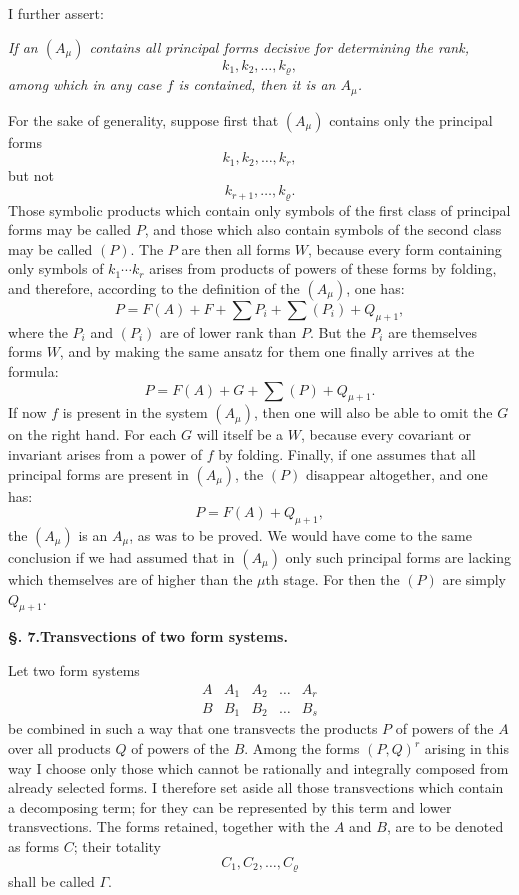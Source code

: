 \documentclass[10pt]{article}
\begin{document}
I further assert:

\emph{If an $(A_\mu)$ contains all principal forms decisive for determining the rank,}
\[
k_1,k_2,\ldots,k_\varrho,
\]
\emph{among which in any case $f$ is contained, then it is an $A_\mu$.}

For the sake of generality, suppose first that $(A_\mu)$ contains only the principal forms
\[
k_1,k_2,\ldots,k_r,
\]
but not
\[
k_{r+1},\ldots,k_\varrho.
\]
Those symbolic products which contain only symbols of the first class of principal forms may be called $P$, and those which also contain symbols of the second class may be called $(P)$. The $P$ are then all forms $W$, because every form containing only symbols of $k_1\cdots k_r$ arises from products of powers of these forms by folding, and therefore, according to the definition of the $(A_\mu)$, one has:
\[
P=F(A)+F+\sum P_i+\sum(P_i)+Q_{\mu+1},
\]
where the $P_i$ and $(P_i)$ are of lower rank than $P$. But the $P_i$ are themselves forms $W$, and by making the same ansatz for them one finally arrives at the formula:
\[
P=F(A)+G+\sum(P)+Q_{\mu+1}.
\]
If now $f$ is present in the system $(A_\mu)$, then one will also be able to omit the $G$ on the right hand. For each $G$ will itself be a $W$, because every covariant or invariant arises from a power of $f$ by folding. Finally, if one assumes that all principal forms are present in $(A_\mu)$, the $(P)$ disappear altogether, and one has:
\[
P=F(A)+Q_{\mu+1},
\]
the $(A_\mu)$ is an $A_\mu$, as was to be proved. We would have come to the same conclusion if we had assumed that in $(A_\mu)$ only such principal forms are lacking which themselves are of higher than the $\mu$th stage. For then the $(P)$ are simply $Q_{\mu+1}$.

\begin{center}
{\bfseries §. 7.\quad Transvections of two form systems.}
\end{center}

Let two form systems
\[
\begin{array}{ccccc}
A&A_1&A_2&\ldots&A_r\\
B&B_1&B_2&\ldots&B_s
\end{array}
\]
be combined in such a way that one transvects the products $P$ of powers of the $A$ over all products $Q$ of powers of the $B$. Among the forms $(P,Q)^r$ arising in this way I choose only those which cannot be rationally and integrally composed from already selected forms. I therefore set aside all those transvections which contain a decomposing term; for they can be represented by this term and lower transvections. The forms retained, together with the $A$ and $B$, are to be denoted as forms $C$; their totality
\[
C_1,C_2,\ldots,C_\varrho
\]
shall be called $\Gamma$.
\end{document}
